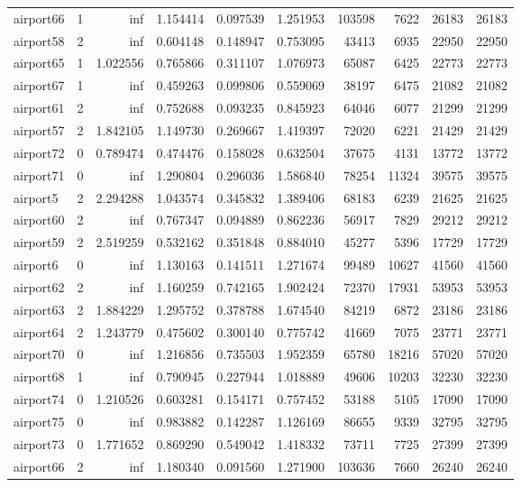 \begin{longtable}{|l|r|r|r|r|r|r|r|r|r|}
airport66 & 1 & inf & 1.154414 & 0.097539 & 1.251953 & 103598 & 7622 & 26183 & 26183 \\
airport58 & 2 & inf & 0.604148 & 0.148947 & 0.753095 & 43413 & 6935 & 22950 & 22950 \\
airport65 & 1 & 1.022556 & 0.765866 & 0.311107 & 1.076973 & 65087 & 6425 & 22773 & 22773 \\
airport67 & 1 & inf & 0.459263 & 0.099806 & 0.559069 & 38197 & 6475 & 21082 & 21082 \\
airport61 & 2 & inf & 0.752688 & 0.093235 & 0.845923 & 64046 & 6077 & 21299 & 21299 \\
airport57 & 2 & 1.842105 & 1.149730 & 0.269667 & 1.419397 & 72020 & 6221 & 21429 & 21429 \\
airport72 & 0 & 0.789474 & 0.474476 & 0.158028 & 0.632504 & 37675 & 4131 & 13772 & 13772 \\
airport71 & 0 & inf & 1.290804 & 0.296036 & 1.586840 & 78254 & 11324 & 39575 & 39575 \\
airport5 & 2 & 2.294288 & 1.043574 & 0.345832 & 1.389406 & 68183 & 6239 & 21625 & 21625 \\
airport60 & 2 & inf & 0.767347 & 0.094889 & 0.862236 & 56917 & 7829 & 29212 & 29212 \\
airport59 & 2 & 2.519259 & 0.532162 & 0.351848 & 0.884010 & 45277 & 5396 & 17729 & 17729 \\
airport6 & 0 & inf & 1.130163 & 0.141511 & 1.271674 & 99489 & 10627 & 41560 & 41560 \\
airport62 & 2 & inf & 1.160259 & 0.742165 & 1.902424 & 72370 & 17931 & 53953 & 53953 \\
airport63 & 2 & 1.884229 & 1.295752 & 0.378788 & 1.674540 & 84219 & 6872 & 23186 & 23186 \\
airport64 & 2 & 1.243779 & 0.475602 & 0.300140 & 0.775742 & 41669 & 7075 & 23771 & 23771 \\
airport70 & 0 & inf & 1.216856 & 0.735503 & 1.952359 & 65780 & 18216 & 57020 & 57020 \\
airport68 & 1 & inf & 0.790945 & 0.227944 & 1.018889 & 49606 & 10203 & 32230 & 32230 \\
airport74 & 0 & 1.210526 & 0.603281 & 0.154171 & 0.757452 & 53188 & 5105 & 17090 & 17090 \\
airport75 & 0 & inf & 0.983882 & 0.142287 & 1.126169 & 86655 & 9339 & 32795 & 32795 \\
airport73 & 0 & 1.771652 & 0.869290 & 0.549042 & 1.418332 & 73711 & 7725 & 27399 & 27399 \\
airport66 & 2 & inf & 1.180340 & 0.091560 & 1.271900 & 103636 & 7660 & 26240 & 26240 \\

\end{longtable}
